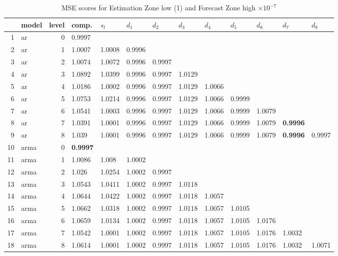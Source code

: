\documentclass[10pt,a4paper]{article}
\begin{document}
\begin{table}[ht]
\centering
\caption{MSE scores for Estimation Zone low (1) and Forecast Zone high $ \times 10^{-7}$} 
\begin{tabular}{rlrllllllllll}
  \hline
 & model & level & comp. & $s_l$ & $d_1$ & $d_2$ & $d_3$ & $d_4$ & $d_5$ & $d_6$ & $d_7$ & $d_8$ \\ 
  \hline
1 & ar &     0 & 0.9997 &  &  &  &  &  &  &  &  &  \\ 
  2 & ar &     1 & 1.0007 & 1.0008 & 0.9996 &  &  &  &  &  &  &  \\ 
  3 & ar &     2 & 1.0074 & 1.0072 & 0.9996 & 0.9997 &  &  &  &  &  &  \\ 
  4 & ar &     3 & 1.0892 & 1.0399 & 0.9996 & 0.9997 & 1.0129 &  &  &  &  &  \\ 
  5 & ar &     4 & 1.0186 & 1.0002 & 0.9996 & 0.9997 & 1.0129 & 1.0066 &  &  &  &  \\ 
  6 & ar &     5 & 1.0753 & 1.0214 & 0.9996 & 0.9997 & 1.0129 & 1.0066 & 0.9999 &  &  &  \\ 
  7 & ar &     6 & 1.0541 & 1.0003 & 0.9996 & 0.9997 & 1.0129 & 1.0066 & 0.9999 & 1.0079 &  &  \\ 
  8 & ar &     7 & 1.0391 & 1.0001 & 0.9996 & 0.9997 & 1.0129 & 1.0066 & 0.9999 & 1.0079 & \textbf{0.9996} &  \\ 
  9 & ar &     8 & 1.039 & 1.0001 & 0.9996 & 0.9997 & 1.0129 & 1.0066 & 0.9999 & 1.0079 & \textbf{0.9996} & 0.9997 \\ 
   \hline
10 & arma &     0 & \textbf{0.9997} &  &  &  &  &  &  &  &  &  \\ 
  11 & arma &     1 & 1.0086 & 1.008 & 1.0002 &  &  &  &  &  &  &  \\ 
  12 & arma &     2 & 1.026 & 1.0254 & 1.0002 & 0.9997 &  &  &  &  &  &  \\ 
  13 & arma &     3 & 1.0543 & 1.0411 & 1.0002 & 0.9997 & 1.0118 &  &  &  &  &  \\ 
  14 & arma &     4 & 1.0644 & 1.0422 & 1.0002 & 0.9997 & 1.0118 & 1.0057 &  &  &  &  \\ 
  15 & arma &     5 & 1.0662 & 1.0318 & 1.0002 & 0.9997 & 1.0118 & 1.0057 & 1.0105 &  &  &  \\ 
  16 & arma &     6 & 1.0659 & 1.0134 & 1.0002 & 0.9997 & 1.0118 & 1.0057 & 1.0105 & 1.0176 &  &  \\ 
  17 & arma &     7 & 1.0542 & 1.0001 & 1.0002 & 0.9997 & 1.0118 & 1.0057 & 1.0105 & 1.0176 & 1.0032 &  \\ 
  18 & arma &     8 & 1.0614 & 1.0001 & 1.0002 & 0.9997 & 1.0118 & 1.0057 & 1.0105 & 1.0176 & 1.0032 & 1.0071 \\ 

\end{tabular}
\end{table}
\end{document}
